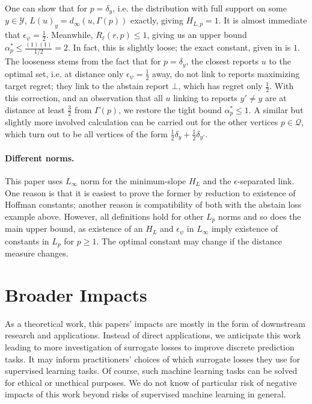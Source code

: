 \documentclass{article}
\theoremstyle{definition}\newtheorem{definition}{Definition}
\theoremstyle{definition}\newtheorem{assumption}{Assumption}
\newcommand{\Y}{\mathcal{Y}}
\begin{document}
One can show that for $p = \delta_y$, i.e. the distribution with full support on some $y \in \Y$, $L(u)_y = d_{\infty}(u,\Gamma(p))$ exactly, giving $H_{L,p} = 1$.
It is almost immediate that $\epsilon_{\psi} = \tfrac{1}{2}$.
Meanwhile, $R_{\ell}(r,p) \leq 1$, giving us an upper bound $\alpha^*_p \leq \frac{(1)(1)}{1/2} = 2$.
In fact, this is slightly loose; the exact constant, given in \cite{ramaswamy2018consistent} is $1$.
The looseness stems from the fact that for $p = \delta_y$, the closest reports $u$ to the optimal set, i.e. at distance only $\epsilon_{\psi} = \tfrac{1}{2}$ away, do not link to reports maximizing target regret; they link to the abstain report $\bot$, which has regret only $\tfrac{1}{2}$.
With this correction, and an observation that all $u$ linking to reports $y' \neq y$ are at distance at least $\tfrac{3}{2}$ from $\Gamma(p)$, we restore the tight bound $\alpha^*_p \leq 1$.
A similar but slightly more involved calculation can be carried out for the other vertices $p \in \mathcal{Q}$, which turn out to be all vertices of the form $\tfrac{1}{2} \delta_y + \tfrac{1}{2} \delta_{y'}$.

\paragraph{Different norms.}
This paper uses $L_{\infty}$ norm for the minimum-slope $H_L$ and the $\epsilon$-separated link.
One reason is that it is easiest to prove the former by reduction to existence of Hoffman constants; another reason is compatibility of both with the abstain loss example above.
However, all definitions hold for other $L_p$ norms and so does the main upper bound, as existence of an $H_L$ and $\epsilon_{\psi}$ in $L_{\infty}$ imply existence of constants in $L_p$ for $p \geq 1$.
The optimal constant may change if the distance measure changes.


\section{Broader Impacts}
As a theoretical work, this papers' impacts are mostly in the form of downstream research and applications.
Instead of direct applications, we anticipate this work leading to more investigation of surrogate losses to improve discrete prediction tasks.
It may inform practitioners' choices of which surrogate losses they use for supervised learning tasks.
Of course, such machine learning tasks can be solved for ethical or unethical purposes.
We do not know of particular risk of negative impacts of this work beyond risks of supervised machine learning in general.
\end{document}
